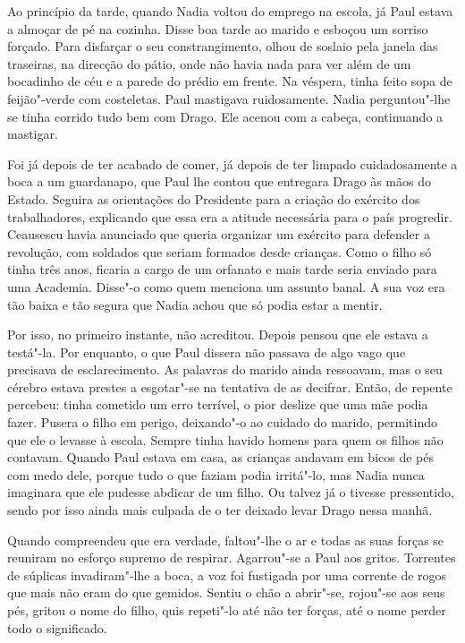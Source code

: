 Ao princípio da tarde, quando Nadia voltou do emprego na escola, já Paul
estava a almoçar de pé na cozinha. Disse boa tarde ao marido e esboçou
um sorriso forçado. Para disfarçar o seu constrangimento, olhou de
soslaio pela janela das traseiras, na direcção do pátio, onde não havia
nada para ver além de um bocadinho de céu e a parede do prédio em
frente. Na véspera, tinha feito sopa de feijão"-verde com costeletas. Paul mastigava ruidosamente. Nadia perguntou"-lhe
se tinha corrido tudo bem com Drago. Ele acenou com a cabeça,
continuando a mastigar.

Foi já depois de ter acabado de comer, já depois de ter limpado
cuidadosamente a boca a um guardanapo, que Paul lhe contou que entregara
Drago às mãos do Estado. Seguira as orientações do Presidente para a
criação do exército dos trabalhadores, explicando que essa era a atitude necessária para o país progredir. Ceausescu havia anunciado que
queria organizar um exército para defender a revolução, com soldados que
seriam formados desde crianças. Como o filho só tinha três anos, ficaria
a cargo de um orfanato e mais tarde seria enviado para uma Academia.
Disse"-o como quem menciona um assunto banal. A sua voz era tão baixa e
tão segura que Nadia achou que só podia estar a mentir.

Por isso, no primeiro instante, não acreditou. Depois
pensou que ele estava a testá"-la. Por enquanto, o que Paul dissera não
passava de algo vago que precisava de esclarecimento. As palavras do
marido ainda ressoavam, mas o seu cérebro estava prestes a esgotar"-se na
tentativa de as decifrar. Então, de repente percebeu: tinha cometido um
erro terrível, o pior deslize que uma mãe podia fazer.
Pusera o filho em perigo, deixando"-o ao cuidado do marido, permitindo
que ele o levasse à escola. Sempre tinha havido homens para quem os
filhos não contavam. Quando Paul estava em casa, as crianças andavam em
bicos de pés com medo dele, porque tudo o que faziam podia irritá"-lo,
mas Nadia nunca imaginara que ele pudesse abdicar de um filho. Ou talvez
já o tivesse pressentido, sendo por isso ainda mais culpada de o ter
deixado levar Drago nessa manhã.

Quando compreendeu que era verdade, faltou"-lhe o ar e todas as suas
forças se reuniram no esforço supremo de respirar. Agarrou"-se a Paul aos
gritos. Torrentes de súplicas invadiram"-lhe a boca, a voz foi fustigada
por uma corrente de rogos que mais não eram do que gemidos. Sentiu o
chão a abrir"-se, rojou"-se aos seus pés, gritou o nome do filho, quis
repeti"-lo até não ter forças, até o nome perder todo o significado.

